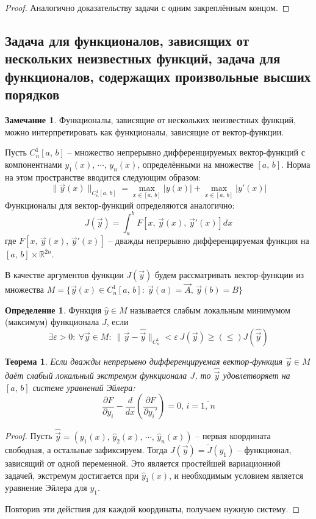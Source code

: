\documentclass[a4paper,12pt]{article}
\renewcommand{\leq}{\ensuremath{\leqslant}}
\renewcommand{\geq}{\ensuremath{\geqslant}}
\theoremstyle{plain}
\newtheorem{theorem}{Теорема}[section]
\theoremstyle{definition}
\newtheorem{definition}{Определение}[section]
\newtheorem*{note}{Замечание}
\theoremstyle{remark}
\begin{document}
\begin{proof}
	Аналогично доказательству задачи с одним закреплённым концом.
\end{proof}

\subsection{Задача для функционалов, зависящих от нескольких неизвестных функций, задача для функционалов, содержащих произвольные высших порядков}
\begin{note}
	Функционалы, зависящие от нескольких неизвестных функций, можно интерпретировать как функционалы, зависящие от вектор-функции.

	Пусть $C_n^1[a,\,b]$ -- множество непрерывно дифференцируемых вектор-функций с компонентнами $y_1(x),\,\cdots,\,y_n(x)$, определёнными на множестве $[a,\,b]$. Норма на этом пространстве вводится следующим образом:
	\[\|\vec{y}(x)\|_{C_n^1[a,\,b]} = \max_{x \in [a,\,b]}|y(x)| + \max_{x \in [a,\,b]}|y'(x)|\]
	Функционалы для вектор-функций определяются аналогично:
	\[J(\vec{y}) = \int_a^bF[x,\,\vec{y}(x),\,\vec{y}'(x)]dx\]
	где $F[x,\,\vec{y}(x),\,\vec{y}'(x)]$ -- дважды непрерывно дифференцируемая функция на $[a,\,b] \times \mathbb{R}^{2n}$.

	В качестве аргументов функции $J(\vec{y})$ будем рассматривать вектор-функции из множества $M = \{\vec{y}(x) \in C_n^1[a,\,b]:\: \vec{y}(a) = \vec{A},\, \vec{y}(b) = B\}$
\end{note}

\begin{definition}
	Функция $\hat{y} \in M$ называется слабым локальным минимумом (максимум) функционала $J$, если
	\[\exists \varepsilon > 0:\: \forall \vec{y} \in M:\: \|\vec{y} - \hat{\vec{y}}\|_{C_n^1} < \varepsilon \: J(\vec{y}) \geq(\leq) J(\hat{\vec{y}})\]
\end{definition}

\begin{theorem}
	Если дважды непрерывно дифференцируемая вектор-функция $\vec{y} \in M$ даёт слабый локальный экстремум функционала $J$, то $\hat{\vec{y}}$ удовлетворяет на $[a,\,b]$ системе уравнений Эйлера:
	\[\frac{\partial F}{\partial y_i} - \frac{d}{dx}\left(\frac{\partial F}{\partial y_i'}\right) = 0,\, i = \overline{1,\,n}\]
\end{theorem}

\begin{proof}
	Пусть $\hat{\vec{y}} = (y_1(x),\,\hat{y}_2(x),\,\cdots,\,\hat{y}_n(x))$ -- первая координата свободная, а остальные зафиксируем. Тогда $J(\vec{y}) = \tilde{J}(y_1)$ -- функционал, зависящий от одной переменной. Это является простейшей вариационной задачей, экстремум достигается при $\hat{y}_1(x)$, и необходимым условием является уравнение Эйлера для $y_1$.

	Повторив эти действия для каждой координаты, получаем нужную систему.
\end{proof}
\end{document}
